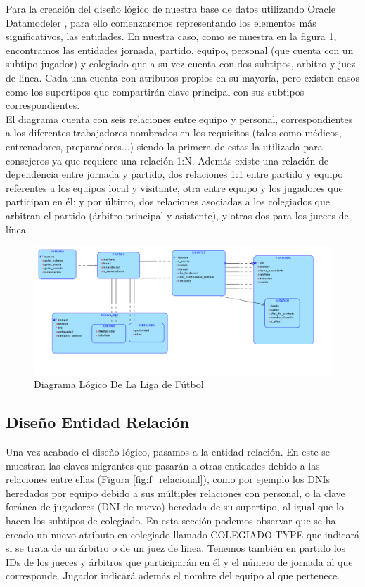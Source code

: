 \documentclass{article}
\begin{document}
Para la creación del diseño lógico de nuestra base de datos utilizando Oracle Datamodeler \cite{oracle2024}, para ello comenzaremos representando los elementos más significativos, las entidades. En nuestra caso, como se muestra en la figura \ref{fig:f_logico}, encontramos las entidades jornada, partido, equipo, personal (que cuenta con un subtipo jugador) y colegiado que a su vez cuenta con dos subtipos, arbitro y juez de linea. Cada una cuenta con atributos propios en su mayoría, pero existen casos como los supertipos que compartirán clave principal con sus subtipos correspondientes.
\\

El diagrama cuenta con seis relaciones entre equipo y personal, correspondientes a los diferentes trabajadores nombrados en los requisitos (tales como médicos, entrenadores, preparadores...) siendo la primera de estas la utilizada para consejeros ya que requiere una relación 1:N. Además existe una relación de dependencia entre jornada y partido, dos relaciones 1:1 entre partido y equipo referentes a los equipos local y visitante, otra entre equipo y los jugadores que participan en él; y por último, dos relaciones asociadas a los colegiados que arbitran el partido (árbitro principal y asistente), y otras dos para los jueces de línea.
\\

\begin{figure}[H]
	\centering
	\includegraphics[width=\textwidth]{images/diagrama_logico_futbol.png}
	\caption{Diagrama Lógico De La Liga de Fútbol}
	\label{fig:f_logico}
\end{figure}

\newpage

\subsection{Diseño Entidad Relación}
Una vez acabado el diseño lógico, pasamos a la entidad relación. En este se muestran las claves migrantes que pasarán a otras entidades debido a las relaciones entre ellas (Figura \ref{fig:f_relacional}), como por ejemplo los DNIs heredados por equipo debido a sus múltiples relaciones con personal, o la clave foránea de jugadores (DNI de nuevo) heredada de su supertipo, al igual que lo hacen los subtipos de colegiado. En esta sección podemos observar que se ha creado un nuevo atributo en colegiado llamado COLEGIADO TYPE que indicará si se trata de un árbitro o de un juez de línea. Tenemos también en partido los IDs de los jueces y árbitros que participarán en él y el número de jornada al que corresponde. Jugador indicará además el nombre del equipo al que pertenece.
\\
\end{document}
